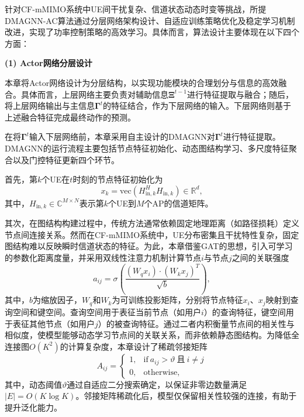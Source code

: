 针对CF-mMIMO系统中UE间干扰复杂、信道状态动态时变等挑战，所提DMAGNN-AC算法通过分层网络架构设计、自适应训练策略优化及稳定学习机制改进，实现了功率控制策略的高效学习。具体而言，算法设计主要体现在以下四个方面：

\textbf{(1) Actor网络分层设计}

本章将Actor网络设计为分层结构，以实现功能模块的合理划分与信息的高效融合。具体而言，上层网络主要负责对辅助信息$\boldsymbol{\Xi}^{t-1}$进行特征提取与融合；随后，将上层网络输出与主信息$\boldsymbol{\Gamma}^t$的特征结合，作为下层网络的输入。下层网络则基于上述融合特征完成最终动作的预测。

在将$\boldsymbol{\Gamma}^t$输入下层网络前，本章采用自主设计的DMAGNN对$\boldsymbol{\Gamma}^t$进行特征提取。DMAGNN的运行流程主要包括节点特征初始化、动态图结构学习、多尺度特征聚合以及门控特征更新四个环节。

首先，第$k$个UE在$t$时刻的节点特征初始化为
\begin{equation}\label{eq-38}x_k=\text{vec}(H_{\text{in},k}^HH_{\text{in},k})\in \mathbb{R}^d, \end{equation}
其中，$H_{\text{in},k}\in \mathbb{C}^{M\times N}$表示第$k$个UE到$M$个AP的信道矩阵。

其次，在图结构构建过程中，传统方法通常依赖固定地理距离（如路径损耗）定义节点间连接关系。然而在CF-mMIMO系统中，UE分布密集且干扰特性复杂，固定图结构难以反映瞬时信道状态的特征。为此，本章借鉴GAT的思想，引入可学习的参数化距离度量，并采用双线性注意力机制计算节点$i$与节点$j$之间的关联强度
\begin{equation}\label{eq-39}a_{ij}=\sigma \left ( \frac{\left ( W_qx_i \right ) \cdot \left ( W_kx_j \right )  ^T}{\sqrt{b} } \right  ), \end{equation}
其中，$b$为缩放因子，$W_q$和$W_k$为可训练投影矩阵，分别将节点特征$x_i$、$x_j$映射到查询空间和键空间。查询空间用于表征当前节点（如用户$i$）的查询特征，键空间用于表征其他节点（如用户$j$）的被查询特征。通过二者内积衡量节点间的相关性与相似度，使模型能够动态学习节点间的关联关系，而非依赖静态图结构。为降低全连接图$O(K^2)$的计算复杂度，本章设计了稀疏邻接矩阵
\begin{equation}\label{eq-40}A_{ij}=\left\{\begin{matrix}
	1,& \text{if}\ a_{ij}> \vartheta\ \text{且}\ i\ne j\\ 
	0,& \text{otherwise},
\end{matrix}\right.\end{equation}
其中，动态阈值$\vartheta$通过自适应二分搜索确定，以保证非零边数量满足$|E|=O(K\log K)$。邻接矩阵稀疏化后，模型仅保留相关性较强的连接，有助于提升泛化能力。

